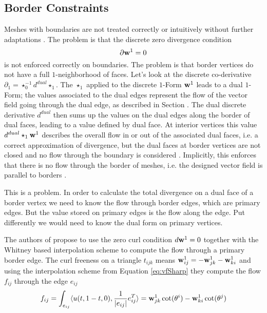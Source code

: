 \subsection{Border Constraints}
Meshes with boundaries are not treated correctly or intuitively without further adaptations . The problem is that the discrete zero divergence condition
\[\partial \textbf{w}^1 = 0\]
is not enforced correctly on boundaries. The problem is that border vertices do not have a full $1$-neighborhood of faces. Let's look at the discrete co-derivative $\partial_1 = \star^{-1}_0 d^{dual} \star_1$. The $\star_1$ applied to the discrete $1$-Form $\textbf{w}^1$ leads to a dual $1$-Form; the values associated to the dual edges represent the flow of the vector field going through the dual edge, as described in Section . The dual discrete derivative $d^{dual}$ then sums up the values on the dual edges along the border of dual faces, leading to a value defined by dual face. At interior vertices this value $d^{dual} \star_1 \textbf{w}^1$ describes the overall flow in or out of the associated dual faces, i.e. a correct approximation of divergence, but the dual faces at border vertices are not closed and no flow through the boundary is considered . Implicitly, this enforces that there is no flow through the border of meshes, i.e. the designed vector field is parallel to borders .

This is a problem. In order to calculate the total divergence on a dual face of a border vertex we need to know the flow through border edges, which are primary edges. But the value stored on primary edges is the flow along the edge. Put differently we would need to know the dual form on primary vertices. 

The authors of  propose to use the zero curl condition $d\textbf{w}^1 = 0$ together with the Whitney based interpolation scheme to compute the flow through a primary border edge. The curl freeness on a triangle $t_{ijk}$ means $\textbf{w}^1_{ij} = - \textbf{w}^1_{jk} - \textbf{w}^1_{ki}$ and using the interpolation scheme from Equation \ref{eq:vfSharp} they compute the flow $f_{ij}$ through the edge $e_{ij}$
\begin{equation}f_{ij} = \int_{e_{ij}}\langle u(t, 1-t, 0), \frac{1}{\left| e_{ij} \right|}e_{ij}^{T}\rangle = \textbf{w}^1_{jk} \cot(\theta^i) - \textbf{w}^1_{ki} \cot(\theta^j)\label{eq:vfFluxBorder}\end{equation}

